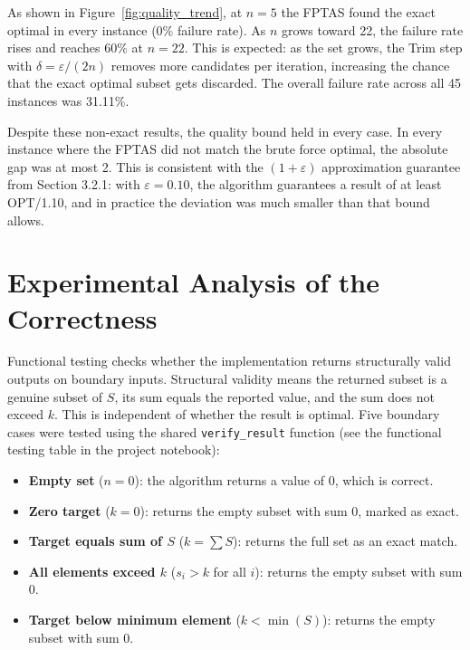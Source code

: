\documentclass[12pt,a4paper]{article}
\theoremstyle{definition}
\begin{document}
As shown in Figure~\ref{fig:quality_trend}, at $n = 5$ the FPTAS found the exact optimal in every instance (0\% failure rate). As $n$ grows toward 22, the failure rate rises and reaches 60\% at $n = 22$. This is expected: as the set grows, the Trim step with $\delta = \varepsilon/(2n)$ removes more candidates per iteration, increasing the chance that the exact optimal subset gets discarded. The overall failure rate across all 45 instances was 31.11\%.

Despite these non-exact results, the quality bound held in every case. In every instance where the FPTAS did not match the brute force optimal, the absolute gap was at most 2. This is consistent with the $(1+\varepsilon)$ approximation guarantee from Section 3.2.1: with $\varepsilon = 0.10$, the algorithm guarantees a result of at least OPT/1.10, and in practice the deviation was much smaller than that bound allows.

\section{Experimental Analysis of the Correctness}

Functional testing checks whether the implementation returns structurally valid outputs on boundary inputs. Structural validity means the returned subset is a genuine subset of $S$, its sum equals the reported value, and the sum does not exceed $k$. This is independent of whether the result is optimal. Five boundary cases were tested using the shared \texttt{verify\_result} function (see the functional testing table in the project notebook):

\begin{itemize}[noitemsep]
    \item \textbf{Empty set} ($n = 0$): the algorithm returns a value of 0, which is correct.
    \item \textbf{Zero target} ($k = 0$): returns the empty subset with sum 0, marked as exact.
    \item \textbf{Target equals sum of $S$} ($k = \sum S$): returns the full set as an exact match.
    \item \textbf{All elements exceed $k$} ($s_i > k$ for all $i$): returns the empty subset with sum 0.
    \item \textbf{Target below minimum element} ($k < \min(S)$): returns the empty subset with sum 0.
\end{itemize}
\end{document}
